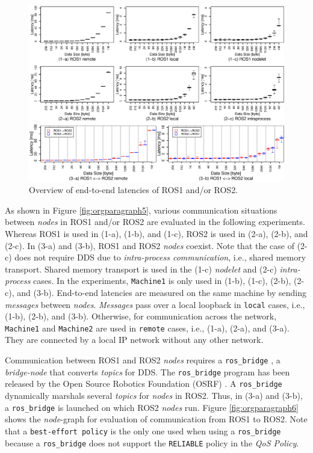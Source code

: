 \documentclass{sig-alternate-05-2015}
\begin{document}
\begin{figure}[t]
\centering
\includegraphics[width=1.0\linewidth]{../figure/overview_BoxPlot.eps}
\caption{\label{fig:overview_boxplot}
Overview of end-to-end latencies of ROS1 and/or ROS2.}
\end{figure}


As shown in Figure \ref{fig:orgparagraph5}, various communication situations between \emph{nodes} in ROS1 and/or ROS2 are evaluated in the following experiments.
Whereas ROS1 is used in (1-a), (1-b), and (1-c), ROS2 is used in (2-a), (2-b), and (2-c). 
In (3-a) and (3-b), ROS1 and ROS2 \emph{nodes} coexist.
Note that the case of (2-c) does not require DDS due to \emph{intra-process communication}, i.e., shared memory transport.
Shared memory transport is used in the (1-c) \emph{nodelet} and (2-c) \emph{intra-process} cases.
In the experiments, \texttt{Machine1} is only used in (1-b), (1-c), (2-b), (2-c), and (3-b).
End-to-end latencies are measured on the same machine by sending \emph{messages} between \emph{nodes}.
\emph{Messages} pass over a local loopback in \texttt{local} cases, i.e.,  (1-b), (2-b), and (3-b).
Otherwise, for communication across the network, \texttt{Machine1} and \texttt{Machine2} are used in \texttt{remote} cases, i.e., (1-a), (2-a), and (3-a).
They are connected by a local IP network without any other network.

Communication between ROS1 and ROS2 \emph{nodes} requires a \texttt{ros\_bridge} \cite{ros2@roscon2015}, a \emph{bridge-node} that converts \emph{topics} for DDS. 
The \texttt{ros\_bridge} program has been released by the Open Source Robotics Foundation (OSRF) \cite{osrf}.
A \texttt{ros\_bridge} dynamically marshals several \emph{topics} for \emph{nodes} in ROS2. 
Thus, in (3-a) and (3-b), a \texttt{ros\_bridge} is launched on which ROS2 \emph{nodes} run.
Figure \ref{fig:orgparagraph6} shows the \emph{node}-graph for evaluation of communication from ROS1 to ROS2.
Note that a \texttt{best-effort policy} is the only one used when using a \texttt{ros\_bridge} because a \texttt{ros\_bridge} does not support the \texttt{RELIABLE} policy in the \emph{QoS Policy}. 
\end{document}
